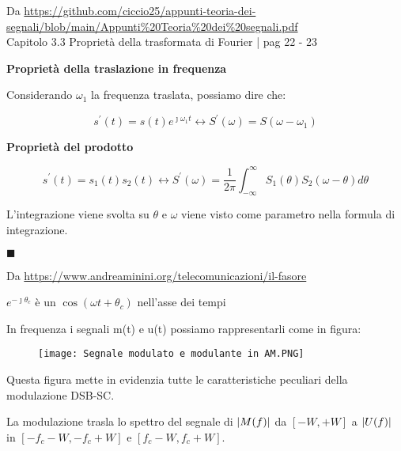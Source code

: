 \begin{tcolorbox}
    
    Da \url{https://github.com/ciccio25/appunti-teoria-dei-segnali/blob/main/Appunti%20Teoria%20dei%20segnali.pdf} \\
    Capitolo 3.3 Proprietà della trasformata di Fourier | pag 22 - 23 \newline
    
    \textbf{Proprietà della traslazione in frequenza}

Considerando $\omega_1$ la frequenza traslata, possiamo dire che: 

{
    \Large 
    \begin{equation}
        s^{'} (t) = s(t) e^{\jmath \omega_1 t} 
        \leftrightarrow 
        S^{'} (\omega) = S(\omega -\omega_1)
    \end{equation}
}

\textbf{Proprietà del prodotto}

{
    \Large 
    \begin{equation}
        s^{'} (t) = s_1(t) s_2 (t) 
        \leftrightarrow 
        S^{'}(\omega) = \frac{1}{2 \pi} \int_{-\infty}^{\infty}S_1(\theta) S_2 (\omega - \theta) d\theta
    \end{equation}
}

L'integrazione viene svolta su $\theta$ e $\omega$ viene visto come parametro nella formula di integrazione. \newline 

$\blacksquare$ \newline 

Da \url{https://www.andreaminini.org/telecomunicazioni/il-fasore} \newline

$e^{-\jmath \theta_c}$ è un $\cos(\omega t + \theta_c)$ nell'asse dei tempi 

\end{tcolorbox}

In frequenza i segnali m(t) e u(t) possiamo rappresentarli come in figura: 

\begin{figure}[h]
    \centering
    \texttt{[image: Segnale modulato e modulante in AM.PNG]}
\end{figure} 

Questa figura mette in evidenzia tutte le caratteristiche peculiari della modulazione DSB-SC. \newline 

La modulazione trasla lo spettro del segnale di $\abs{M(f)}$ da $[-W, +W]$ a $\abs{U(f)}$ in $[-f_c - W, -f_c +W]$ e $[f_c - W, f_c +W]$. \newline 

